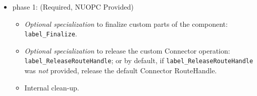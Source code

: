 \begin{itemize}
\item phase 1: ({\sc Required, NUOPC Provided})
  \begin{itemize}
  \item {\it Optional specialization} to finalize custom parts of the component: {\tt label\_Finalize}.
  \item {\it Optional specialization} to release the custom Connector operation: {\tt label\_ReleaseRouteHandle}; or by default, if {\tt label\_ReleaseRouteHandle} was {\em not} provided, release the default Connector RouteHandle.
  \item Internal clean-up.
  \end{itemize}      
\end{itemize}

\mbox{}\hrulefill\ 


